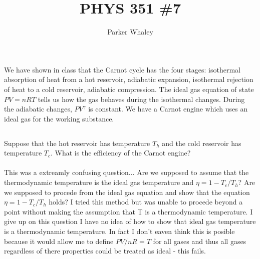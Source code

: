 \documentclass[10pt,a4paper]{article}
\author{Parker Whaley}
\title{PHYS 351 \#7}
\begin{document}
\maketitle
\section{}
We have shown in class that the Carnot cycle has the four stages: isothermal absorption of heat from a hot reservoir, adiabatic expansion, isothermal rejection of heat to a cold reservoir, adiabatic compression. The ideal gas equation of state $PV = nRT$ tells us how the gas behaves during the isothermal changes. During the adiabatic changes, $P V^{\gamma}$ is constant. We have a Carnot engine which uses an ideal gas for the working substance.
\subsection{}
 Suppose that the hot reservoir has temperature $T_h$ and the cold reservoir has temperature $T_c$. What is the efficiency of the Carnot engine?\\\\
This was a extreamly confusing question...  Are we supposed to assume that the thermodynamic temperature is the ideal gas temperature and $\eta=1-T_c/T_h$?  Are we supposed to procede from the ideal gas equation and show that the equation $\eta=1-T_c/T_h$ holds?  I tried this method but was unable to procede beyond a point without making the assumption that T is a thermodynamic temperature.  I give up on this question I have no idea of how to show that ideal gas temperature is a thermodynamic temperature.  In fact I don't eaven think this is posible because it would allow me to define $PV/nR=T$ for all gases and thus all gases regardless of there properties could be treated as ideal - this fails.
\end{document}

